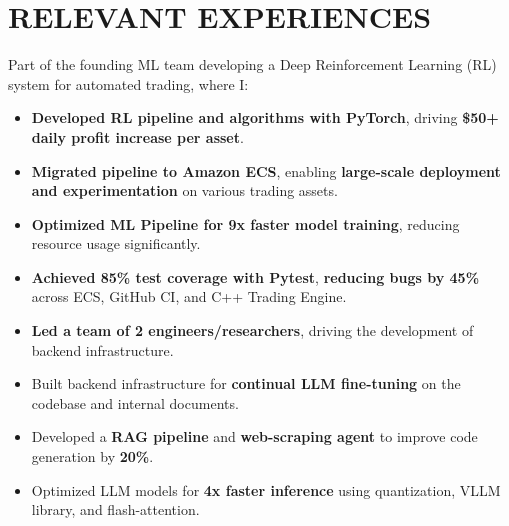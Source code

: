 \section{RELEVANT EXPERIENCES}

{
}
Part of the founding ML team developing a Deep Reinforcement Learning (RL) system for automated trading, where I:
\begin{itemize}
    \item \textbf{Developed RL pipeline and algorithms with PyTorch}, driving \textbf{\$50+ daily profit increase per asset}.
    \item \textbf{Migrated pipeline to Amazon ECS}, enabling \textbf{large-scale deployment and experimentation} on various trading assets.
    \item \textbf{Optimized ML Pipeline for 9x faster model training}, reducing resource usage significantly.
    \item  \textbf{Achieved 85\% test coverage with Pytest}, \textbf{reducing bugs by 45\%} across ECS, GitHub CI, and C++ Trading Engine.
\end{itemize}

{
}
\begin{itemize}
    \item \textbf{Led a team of 2 engineers/researchers}, driving the development of backend infrastructure.
    \item Built backend infrastructure for \textbf{continual LLM fine-tuning} on the codebase and internal documents.
    \item Developed a \textbf{RAG pipeline} and \textbf{web-scraping agent} to improve code generation by \textbf{20\%}.
    \item Optimized LLM models for \textbf{4x faster inference} using quantization, VLLM library, and flash-attention.
\end{itemize}

